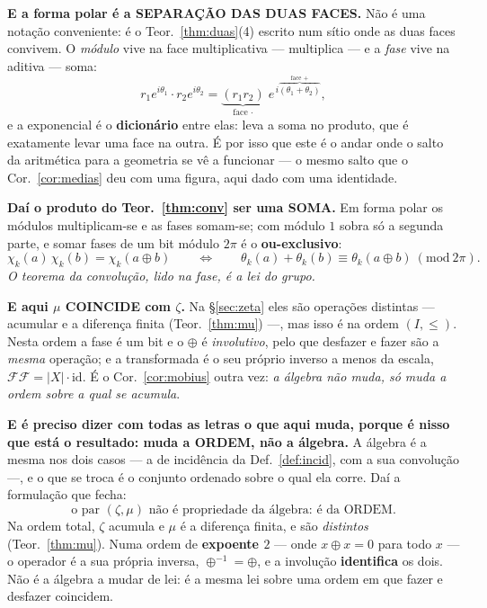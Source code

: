 \documentclass[11pt,a4paper]{article}
\begin{document}
\medskip\noindent\textbf{E a forma polar é a SEPARAÇÃO DAS DUAS FACES.} Não é
uma notação conveniente: é o Teor.~\ref{thm:duas}(4) escrito num sítio onde as
duas faces convivem. O \emph{módulo} vive na face multiplicativa --- multiplica
--- e a \emph{fase} vive na aditiva --- soma:
\[
r_{1}e^{i\theta_{1}}\cdot r_{2}e^{i\theta_{2}}
=\underbrace{(r_{1}r_{2})}_{\text{face }\cdot}\;
 e^{\,i\overbrace{(\theta_{1}+\theta_{2})}^{\text{face }+}} ,
\]
e a exponencial é o \textbf{dicionário} entre elas: leva a soma no produto, que
é exatamente levar uma face na outra. É por isso que este é o andar onde o salto
da aritmética para a geometria se vê a funcionar --- o mesmo salto que o
Cor.~\ref{cor:medias} deu com uma figura, aqui dado com uma identidade.

\medskip\noindent\textbf{Daí o produto do Teor.~\ref{thm:conv} ser uma SOMA.} Em
forma polar os módulos multiplicam-se e as fases somam-se; com módulo $1$ sobra
só a segunda parte, e somar fases de um bit módulo $2\pi$ é o
\textbf{ou-exclusivo}:
\[
\chi_k(a)\,\chi_k(b)=\chi_k(a\oplus b)
\qquad\Longleftrightarrow\qquad
\theta_k(a)+\theta_k(b)\equiv\theta_k(a\oplus b)\ (\mathrm{mod}\ 2\pi).
\]
\emph{O teorema da convolução, lido na fase, é a lei do grupo.}

\medskip\noindent\textbf{E aqui $\mu$ COINCIDE com $\zeta$.} Na
§\ref{sec:zeta} eles são operações distintas --- acumular e a diferença
finita (Teor.~\ref{thm:mu}) ---, mas isso é na ordem $(I,\le)$. Nesta ordem a
fase é um bit e o $\oplus$ é \emph{involutivo}, pelo que desfazer e fazer são a
\emph{mesma} operação; e a transformada é o seu próprio inverso a menos da
escala, $\mathcal{F}\mathcal{F}=\lvert X\rvert\cdot\mathrm{id}$. É o
Cor.~\ref{cor:mobius} outra vez: \emph{a álgebra não muda, só muda a ordem sobre
a qual se acumula}.

\medskip\noindent\textbf{E é preciso dizer com todas as letras o que aqui muda,
porque é nisso que está o resultado: muda a ORDEM, não a álgebra.} A álgebra é a
mesma nos dois casos --- a de incidência da Def.~\ref{def:incid}, com a sua
convolução ---, e o que se troca é o conjunto ordenado sobre o qual ela corre.
Daí a formulação que fecha:
\[
\boxed{\;\text{o par }(\zeta,\mu)\text{ não é propriedade da álgebra: é da ORDEM.}\;}
\]
Na ordem total, $\zeta$ acumula e $\mu$ é a diferença finita, e são
\emph{distintos} (Teor.~\ref{thm:mu}). Numa ordem de \textbf{expoente $2$} ---
onde $x\oplus x=0$ para todo $x$ --- o operador é a sua própria inversa,
$\oplus^{-1}=\oplus$, e a involução \textbf{identifica} os dois. Não é a álgebra
a mudar de lei: é a mesma lei sobre uma ordem em que fazer e desfazer coincidem.
\end{document}
